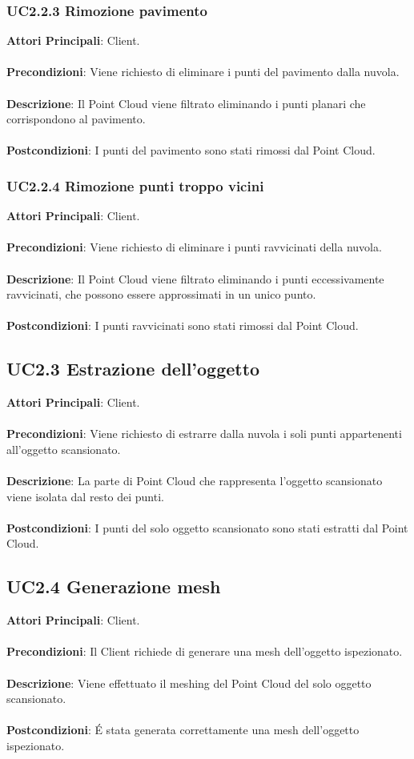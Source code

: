 \subsubsection{UC2.2.3 Rimozione pavimento}
\textbf{Attori Principali}: Client.
\\\\ \textbf{Precondizioni}: Viene richiesto di eliminare i punti del pavimento dalla nuvola.
\\\\ \textbf{Descrizione}: Il Point Cloud viene filtrato eliminando i punti planari che corrispondono al pavimento.
\\\\ \textbf{Postcondizioni}: I punti del pavimento sono stati rimossi dal Point Cloud.

\subsubsection{UC2.2.4 Rimozione punti troppo vicini}
\textbf{Attori Principali}: Client.
\\\\ \textbf{Precondizioni}: Viene richiesto di eliminare i punti ravvicinati della nuvola.
\\\\ \textbf{Descrizione}: Il Point Cloud viene filtrato eliminando i punti eccessivamente ravvicinati, che possono essere approssimati in un unico punto.
\\\\ \textbf{Postcondizioni}: I punti ravvicinati sono stati rimossi dal Point Cloud.

\subsection{UC2.3 Estrazione dell'oggetto}
\textbf{Attori Principali}: Client.
\\\\ \textbf{Precondizioni}: Viene richiesto di estrarre dalla nuvola i soli punti appartenenti all'oggetto scansionato.
\\\\ \textbf{Descrizione}: La parte di Point Cloud che rappresenta l'oggetto scansionato viene isolata dal resto dei punti.
\\\\ \textbf{Postcondizioni}: I punti del solo oggetto scansionato sono stati estratti dal Point Cloud.

\subsection{UC2.4 Generazione mesh}
\textbf{Attori Principali}: Client.
\\\\ \textbf{Precondizioni}: Il Client richiede di generare una mesh dell'oggetto ispezionato.
\\\\ \textbf{Descrizione}: Viene effettuato il meshing del Point Cloud del solo oggetto scansionato.
\\\\ \textbf{Postcondizioni}: \'E stata generata correttamente una mesh dell'oggetto ispezionato.

